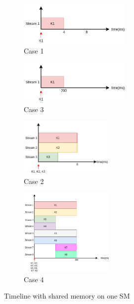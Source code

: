 \documentclass[12pt,journal,compsoc]{IEEEtran}
\begin{document}
\begin{figure}[h]
   \centering
   \begin{subfigure}{0.4\textwidth}
       \includegraphics[width=\textwidth, height=60pt]{figs/shmem_1024_baseline.png}
       \caption{Case 1}
       \label{fig:shmem_case1}
   \end{subfigure}
   \begin{subfigure}{0.4\textwidth}
       \includegraphics[width=\textwidth, height=60pt]{figs/shmem_16384_baseline.png}
       \caption{Case 3}
       \label{fig:shmem_case3}
   \end{subfigure}
   \begin{subfigure}{0.4\textwidth}
      \includegraphics[width=\textwidth, height=80pt]{figs/shmem_1024.png}
      \caption{Case 2}
      \label{fig:shmem_case2}
  \end{subfigure}
   \begin{subfigure}{0.48\textwidth}
      \includegraphics[width=\textwidth, height=120pt]{figs/shmem_16384.png}
      \caption{Case 4}
      \label{fig:shmem_case4}
   \end{subfigure}
   \caption{Timeline with shared memory on one SM}
   \label{fig:scenario1}
\end{figure}
\end{document}
